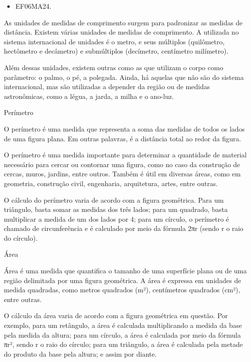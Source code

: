 
\begin{itemize}
\item EF06MA24.
\end{itemize}

As unidades de medidas de comprimento surgem para padronizar as medidas
de distância. Existem várias unidades de medidas de comprimento. A
utilizada no sistema internacional de unidades é o metro, e seus
múltiplos (quilômetro, hectômetro e decâmetro) e submúltiplos
(decímetro, centímetro milímetro).

Além dessas unidades, existem outras como as que utilizam o corpo como
parâmetro: o palmo, o pé, a polegada. Ainda, há aquelas que não são do
sistema internacional, mas são utilizadas a depender da região ou de
medidas astronômicas, como a légua, a jarda, a milha e o ano-luz.

Perímetro

O perímetro é uma medida que representa a soma das medidas de todos os
lados de uma figura plana. Em outras palavras, é a distância total ao
redor da figura.

O perímetro é uma medida importante para determinar a quantidade de
material necessário para cercar ou contornar uma figura, como no caso da
construção de cercas, muros, jardins, entre outros. Também é útil em
diversas áreas, como em geometria, construção civil, engenharia,
arquitetura, artes, entre outras.

O cálculo do perímetro varia de acordo com a figura geométrica. Para um
triângulo, basta somar as medidas dos três lados; para um quadrado,
basta multiplicar a medida de um dos lados por 4; para um círculo, o
perímetro é chamado de circunferência e é calculado por meio da fórmula
2πr (sendo r o raio do círculo).

Área

Área é uma medida que quantifica o tamanho de uma superfície plana ou de
uma região delimitada por uma figura geométrica. A área é expressa em
unidades de medida quadradas, como metros quadrados (m²), centímetros
quadrados (cm²), entre outras.

O cálculo da área varia de acordo com a figura geométrica em questão.
Por exemplo, para um retângulo, a área é calculada multiplicando a
medida da base pela medida da altura; para um círculo, a área é
calculada por meio da fórmula πr², sendo r o raio do círculo; para um
triângulo, a área é calculada pela metade do produto da base pela
altura; e assim por diante.


